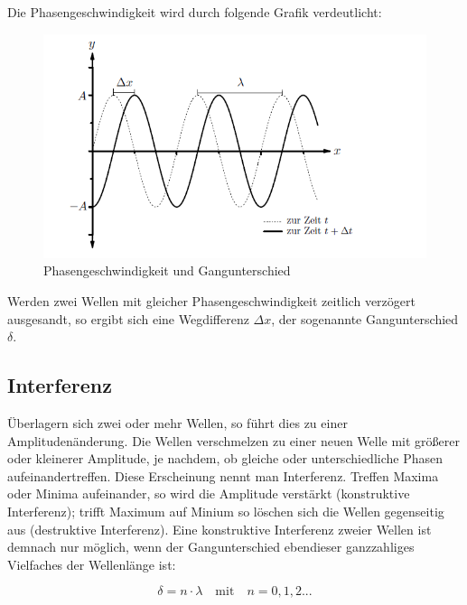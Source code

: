 \documentclass[12pt,a4paper,titlepage,headinclude,bibtotoc]{scrartcl}
\begin{document}
Die Phasengeschwindigkeit wird durch folgende Grafik verdeutlicht:

\begin{figure} [h]
\begin{center}
\includegraphics[scale=0.75]{Phasengeschwindigkeit2.png} \end{center}
\caption{Phasengeschwindigkeit und Gangunterschied}
\end{figure}

Werden zwei Wellen mit gleicher Phasengeschwindigkeit zeitlich verzögert ausgesandt, so ergibt sich eine Wegdifferenz $\Delta x$, der sogenannte Gangunterschied $\delta$. 

\subsection{Interferenz}
Überlagern sich zwei oder mehr Wellen, so führt dies zu einer Amplitudenänderung. Die Wellen verschmelzen zu einer neuen Welle mit größerer oder kleinerer Amplitude, je nachdem, ob gleiche oder unterschiedliche Phasen aufeinandertreffen. Diese Erscheinung nennt man Interferenz. Treffen Maxima oder Minima aufeinander, so wird die Amplitude verstärkt (konstruktive Interferenz); trifft Maximum auf Minium so löschen sich die Wellen gegenseitig aus (destruktive Interferenz). 
Eine konstruktive Interferenz zweier Wellen ist demnach nur möglich, wenn der Gangunterschied ebendieser ganzzahliges Vielfaches der Wellenlänge ist:\\
\par
\begin{equation}
\delta={n}\cdot {\lambda} \quad \mathrm{mit}\quad n = 0,1,2...
\end{equation}
\\
\par
\end{document}
